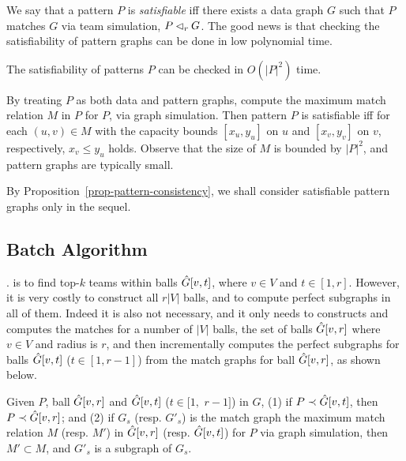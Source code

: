 
We say that a pattern $P$ is {\em satisfiable} iff there exists a data graph $G$ such that $P$ matches $G$ via team simulation, \ie $P \lhd_r G$.
The good news is that checking the satisfiability of pattern graphs can be done in low polynomial time.

\begin{prop}
\label{prop-pattern-consistency}
The satisfiability of patterns $P$ can be checked in $O(|P|^2)$ time.
\end{prop}

By treating $P$ as both data and pattern graphs, compute the maximum match relation $M$ in $P$ for $P$, via graph simulation.
Then pattern $P$ is satisfiable iff for each $(u, v)\in M$ with the capacity bounds $[x_u, y_u]$ on $u$ and $[x_v, y_v]$ on $v$, respectively, $x_v \leq y_u$ holds. Observe that the size of $M$ is bounded by $|P|^2$, and pattern graphs are typically small.

By Proposition~\ref{prop-pattern-consistency}, we shall consider  satisfiable pattern graphs only  in the sequel.



\subsection{Batch Algorithm}


. \teamF{} is to find top-$k$ teams within balls $\hat{G}{[v, t]}$, where $v \in V$ and $t \in [1,r]$.
However, it is very costly to construct all $r|V|$ balls, and to compute perfect subgraphs in all of them.
Indeed it is also not necessary, and it only needs to constructs and computes the matches for a number of $|V|$ balls, \ie the set of balls $\hat{G}{[v, r]}$
where $v \in V$ and radius is $r$, and then incrementally computes the perfect subgraphs for balls $\hat{G}{[v, t]}$ ($t \in [1,r-1]$) from the match graphs for ball $\hat{G}{[v, r]}$, as shown below.

\vspace{-1ex}
\begin{theorem}
	\label{thm-tsim-radius}
	Given $P$, ball $\hat{G}{[v, r]}$ and $\hat{G}{[v, t]}$ ($t \in[1,$ $r-1]$) in $G$,
	(1) if $P\prec \hat{G}{[v, t]}$, then $P\prec \hat{G}{[v, r]}$; and
	(2) if $G_s$ (resp. $G'_s$) is the match graph \wrt the maximum match relation $M$ (resp. $M'$) in $\hat{G}{[v, r]}$ (resp. $\hat{G}{[v, t]}$) for $P$ via graph simulation, then $M' \subset M$, and $G'_s$ is a subgraph of $G_s$.	
\end{theorem}

